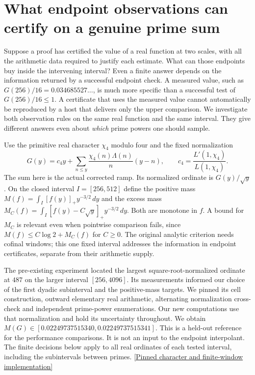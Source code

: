 \documentclass[12pt,letterpaper]{article}
\begin{document}
\section{What endpoint observations can certify on a genuine prime sum}
\label{sec:endmeasurement}
Suppose a proof has certified the value of a real function at two scales, with all the arithmetic data required to justify each estimate. What can those endpoints buy inside the intervening interval? Even a finite answer depends on the information returned by a successful endpoint check. A measured value, such as \(G(256)/16=0.034685527\ldots\), is much more specific than a successful test of \(G(256)/16\le1\). A certificate that uses the measured value cannot automatically be reproduced by a host that delivers only the upper comparison. We investigate both observation rules on the same real function and the same interval. They give different answers even about \emph{which} prime powers one should sample.

Use the primitive real character \(\chi_4\) modulo four and the fixed normalization
\[
 G(y)=c_4 y+\sum_{n\le y}\frac{\chi_4(n)\Lambda(n)}{n}(y-n),
 \qquad c_4=\frac{L'(1,\chi_4)}{L(1,\chi_4)} .
\]
The sum here is the actual corrected ramp. Its normalized ordinate is \(G(y)/\sqrt y\). On the closed interval \(I=[256,512]\) define the positive mass \(M(f)=\int_I [f(y)]_+ y^{-3/2}\,dy\) and the excess mass \(M_C(f)=\int_I[f(y)-C\sqrt y]_+y^{-3/2}\,dy\). Both are monotone in \(f\). A bound for \(M_C\) is relevant even when pointwise comparison fails, since \(M(f)\le C\log2+M_C(f)\) for \(C\ge0\). The original analytic criterion needs cofinal windows; this one fixed interval addresses the information in endpoint certificates, separate from their arithmetic supply.

The pre-existing experiment located the largest square-root-normalized ordinate at \(487\) on the larger interval \([256,4096]\). Its measurements informed our choice of the first dyadic subinterval and the positive-mass targets. We pinned its cell construction, outward elementary real arithmetic, alternating normalization cross-check and independent prime-power enumerations. Our new computations use that normalization and hold its uncertainty throughout. We obtain \(M(G)\in[0.02249737515340,0.02249737515341]\). This is a held-out reference for the performance comparisons. It is not an input to the endpoint interpolant. The finite decisions below apply to all real ordinates of each tested interval, including the subintervals between primes. \href{https://github.com/nousentllc/riemann-hypothesis/blob/5396aa19afa70189268f80237c7897cdce426e24/research/uriel/experiments/exceptional-band-mass/evidence/primes/bands.py}{[Pinned character and finite-window implementation]}
\end{document}
